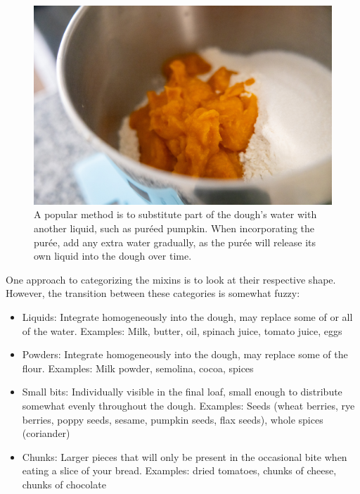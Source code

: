 \begin{figure}[htb!]
  \centering
  \includegraphics[width=\textwidth]{pumpkin-on-flour}
  \caption[Pumpkin purée]{A popular method is to substitute part of the
          dough's water with another liquid, such as puréed pumpkin.  When
          incorporating the purée, add any extra water gradually, as the purée
          will release its own liquid into the dough over time.}%
          \label{fig:pumpkin-on-flour}
\end{figure}

One approach to categorizing the mixins is to look at their respective shape.
However, the transition between these categories is somewhat fuzzy:

\begin{itemize}
  \item Liquids: Integrate homogeneously into the dough, may replace some of
      or all of the water. Examples: Milk, butter, oil, spinach juice, tomato
      juice, eggs
  \item Powders: Integrate homogeneously into the dough, may replace some of
      the flour. Examples: Milk powder, semolina, cocoa, spices
  \item Small bits: Individually visible in the final loaf, small enough to
      distribute somewhat evenly throughout the dough. Examples: Seeds (wheat
      berries, rye berries, poppy seeds, sesame, pumpkin seeds,
      flax seeds), whole spices (coriander)
  \item Chunks: Larger pieces that will only be present in the occasional bite
      when eating a slice of your bread. Examples: dried tomatoes, chunks of
      cheese, chunks of chocolate
\end{itemize}

